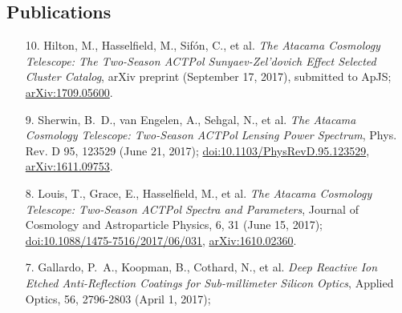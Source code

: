 \documentclass[margin,line]{res}
\begin{document}
\begin{resume}
\section{\sc Publications} 
\begin{enumerate}

\item[{10.}] Hilton, M., Hasselfield, M., Sif{\'o}n, C., et al. \textit{The
Atacama Cosmology Telescope: The Two-Season ACTPol Sunyaev-Zel'dovich Effect
Selected Cluster Catalog}, arXiv preprint (September 17, 2017), submitted to ApJS;
    \href{https://arxiv.org/abs/1709.05600}{arXiv:1709.05600}.
\item[{9.}] Sherwin, B.~D., van Engelen, A., Sehgal, N., et al. \textit{The
    Atacama Cosmology Telescope: Two-Season ACTPol Lensing Power Spectrum},
    Phys. Rev. D 95, 123529 (June 21, 2017);
    \href{https://doi.org/10.1103/PhysRevD.95.123529}{doi:10.1103/PhysRevD.95.123529},
    \href{https://arxiv.org/abs/1611.09753}{arXiv:1611.09753}.
\item[{8.}] Louis, T., Grace, E., Hasselfield, M., et al. \textit{The Atacama
    Cosmology Telescope: Two-Season ACTPol Spectra and Parameters},
    Journal of Cosmology and Astroparticle Physics, 6, 31 (June 15, 2017);
    \href{http://dx.doi.org/10.1088/1475-7516/2017/06/031}{doi:10.1088/1475-7516/2017/06/031},
    \href{https://arxiv.org/abs/1610.02360}{arXiv:1610.02360}.
\item[{7.}] Gallardo, P.~A., Koopman, B., Cothard, N., et al. \textit{Deep
    Reactive Ion Etched Anti-Reflection Coatings for Sub-millimeter Silicon
    Optics}, Applied Optics, 56, 2796-2803 (April 1, 2017);


\end{enumerate}
\end{resume}
\end{document}
